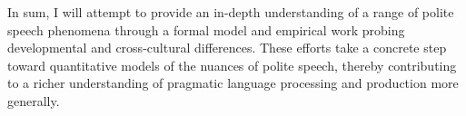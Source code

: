 \noindent In sum, I will attempt to provide an in-depth understanding of a range of polite speech phenomena through a formal model and empirical work probing developmental and cross-cultural differences. These efforts take a concrete step toward quantitative models of the nuances of polite speech, thereby contributing to a richer understanding of pragmatic language processing and production more generally.



